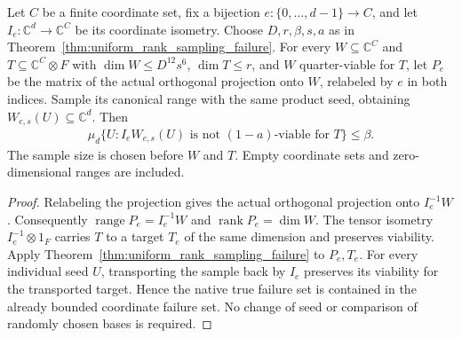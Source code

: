 \begin{theorem}
    \label{thm:native_uniform_rank_sampling_failure}
    \leanok
    Let $C$ be a finite coordinate set, fix a bijection
    $e:\{0,\ldots,d-1\}\to C$, and let
    $I_e:\mathbb C^d\to\mathbb C^C$ be its coordinate isometry.
    Choose $D,r,\beta,s,a$ as in
    Theorem~\ref{thm:uniform_rank_sampling_failure}.
    For every $W\subseteq\mathbb C^C$ and
    $T\subseteq\mathbb C^C\otimes F$ with
    $\dim W\le D^{12}s^6$, $\dim T\le r$, and $W$ quarter-viable
    for $T$, let $P_e$ be the matrix of the actual orthogonal
    projection onto $W$, relabeled by $e$ in both indices.
    Sample its canonical range with the same product seed, obtaining
    $W_{e,s}(U)\subseteq\mathbb C^d$. Then
    \begin{align}
        \mu_d\{U:I_eW_{e,s}(U)
        \text{ is not }(1-a)\text{-viable for }T\}\le\beta.
    \end{align}
    The sample size is chosen before $W$ and $T$.
    Empty coordinate sets and zero-dimensional ranges are included.
\end{theorem}
\begin{proof}\leanok
    Relabeling the projection gives the actual orthogonal projection
    onto $I_e^{-1}W$. Consequently
    $\operatorname{range}P_e=I_e^{-1}W$ and
    $\operatorname{rank}P_e=\dim W$.
    The tensor isometry $I_e^{-1}\otimes1_F$ carries $T$ to a target
    $T_e$ of the same dimension and preserves viability. Apply
    Theorem~\ref{thm:uniform_rank_sampling_failure} to $P_e,T_e$.
    For every individual seed $U$, transporting the sample back by
    $I_e$ preserves its viability for the transported target.
    Hence the native true failure set is contained in the already
    bounded coordinate failure set. No change of seed or comparison
    of randomly chosen bases is required.
\end{proof}
